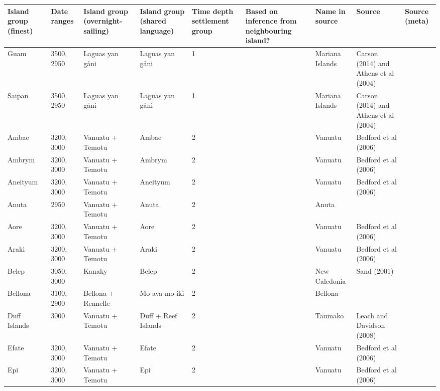 \begin{longtable}{p{2cm}p{2cm}p{2cm}p{2cm}p{2cm}p{2cm}p{2cm}p{2cm}p{2cm}}
  \toprule
Island group (finest) & Date ranges & Island group (overnight-sailing) & Island group (shared language) & Time depth settlement group & Based on inference from neighbouring island? & Name in source & Source & Source (meta) \\ 
  \midrule
Guam & 3500, 2950 & Laguas yan gåni & Laguas yan gåni & 1 &  & Mariana Islands & Carson (2014) and Athens et al (2004) & \citet{rieth_cochrane_2018} \\ 
  Saipan & 3500, 2950 & Laguas yan gåni & Laguas yan gåni & 1 &  & Mariana Islands & Carson (2014) and Athens et al (2004) & \citet{rieth_cochrane_2018} \\ 
  Ambae & 3200, 3000 & Vanuatu + Temotu & Ambae & 2 &  & Vanuatu & Bedford et al (2006) & \citet{rieth_cochrane_2018} \\ 
  Ambrym & 3200, 3000 & Vanuatu + Temotu & Ambrym & 2 &  & Vanuatu & Bedford et al (2006) & \citet{rieth_cochrane_2018} \\ 
  Aneityum & 3200, 3000 & Vanuatu + Temotu & Aneityum & 2 &  & Vanuatu & Bedford et al (2006) & \citet{rieth_cochrane_2018} \\ 
  Anuta & 2950 & Vanuatu + Temotu & Anuta & 2 &  & Anuta & \citet{carson2012recent} &  \\ 
  Aore & 3200, 3000 & Vanuatu + Temotu & Aore & 2 &  & Vanuatu & Bedford et al (2006) & \citet{rieth_cochrane_2018} \\ 
  Araki & 3200, 3000 & Vanuatu + Temotu & Araki & 2 &  & Vanuatu & Bedford et al (2006) & \citet{rieth_cochrane_2018} \\ 
  Belep & 3050, 3000 & Kanaky & Belep & 2 &  & New Caledonia & Sand (2001) & \citet{rieth_cochrane_2018} \\ 
  Bellona & 3100, 2900 & Bellona + Rennelle & Mo-ava-mo-iki & 2 &  & Bellona & \citet{carson2012recent} &  \\ 
  Duff Islands & 3000 & Vanuatu + Temotu & Duff + Reef Islands & 2 &  & Taumako & Leach and Davidson (2008) & \citet{carson2012recent} \\ 
  Efate & 3200, 3000 & Vanuatu + Temotu & Efate & 2 &  & Vanuatu & Bedford et al (2006) & \citet{rieth_cochrane_2018} \\ 
  Epi & 3200, 3000 & Vanuatu + Temotu & Epi & 2 &  & Vanuatu & Bedford et al (2006) & \citet{rieth_cochrane_2018} \\ 

\end{longtable}
